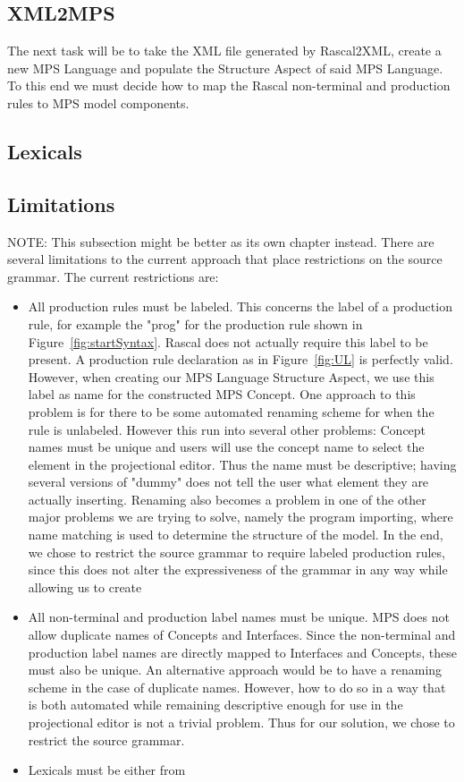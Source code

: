 \documentclass[a4paper]{article}
\begin{document}
\subsection{XML2MPS}
The next task will be to take the XML file generated by Rascal2XML, create a new MPS Language and populate the Structure Aspect of said MPS Language. To this end we must decide how to map the Rascal non-terminal and production rules to MPS model components. 
\subsection{Lexicals}
\subsection{Limitations}
NOTE: This subsection might be better as its own chapter instead.
There are several limitations to the current approach that place restrictions on the source grammar. 
The current restrictions are:

\begin{itemize}
	\item All production rules must be labeled. This concerns the label of a production rule, for example the "prog" for the production rule shown in Figure~\ref{fig:startSyntax}. Rascal does not actually require this label to be present. A production rule declaration as in Figure~\ref{fig:UL} is perfectly valid. However, when creating our MPS Language Structure Aspect, we use this label as name for the constructed MPS Concept. One approach to this problem is for there to be some automated renaming scheme for when the rule is unlabeled. However this run into several other problems: Concept names must be unique and users will use the concept name to select the element in the projectional editor. Thus the name must be descriptive; having several versions of "dummy" does not tell the user what element they are actually inserting. Renaming also becomes a problem in one of the other major problems we are trying to solve, namely the program importing, where name matching is used to determine the structure of the model. In the end, we chose to restrict the source grammar to require labeled production rules, since this does not alter the expressiveness of the grammar in any way while allowing us to create 
	\item All non-terminal and production label names must be unique. MPS does not allow duplicate names of Concepts and Interfaces. Since the non-terminal and production label names are directly mapped to Interfaces and Concepts, these must also be unique. An alternative approach would be to have a renaming scheme in the case of duplicate names. However, how to do so  in a way that is both automated while remaining descriptive enough for use in the projectional editor is not a trivial problem. Thus for our solution, we chose to restrict the source grammar.  
	\item Lexicals must be either from 
	
\end{itemize}
\end{document}
